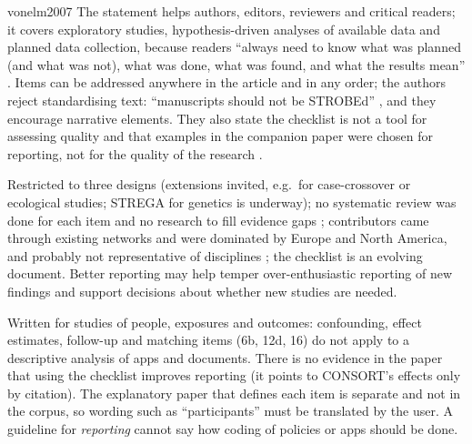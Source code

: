 \begin{papercard}{vonelm2007}
 The statement helps authors, editors, reviewers and critical readers; it covers exploratory studies, hypothesis-driven analyses of available data and planned data collection, because readers ``always need to know what was planned (and what was not), what was done, what was found, and what the results mean'' . Items can be addressed anywhere in the article and in any order; the authors reject standardising text: ``manuscripts should not be STROBEd'' , and they encourage narrative elements. They also state the checklist is not a tool for assessing quality and that examples in the companion paper were chosen for reporting, not for the quality of the research .

 Restricted to three designs (extensions invited, e.g.\ for case-crossover or ecological studies; STREGA for genetics is underway); no systematic review was done for each item and no research to fill evidence gaps ; contributors came through existing networks and were dominated by Europe and North America, and probably not representative of disciplines ; the checklist is an evolving document. Better reporting may help temper over-enthusiastic reporting of new findings and support decisions about whether new studies are needed.

 Written for studies of people, exposures and outcomes: confounding, effect estimates, follow-up and matching items (6b, 12d, 16) do not apply to a descriptive analysis of apps and documents. There is no evidence in the paper that using the checklist improves reporting (it points to CONSORT's effects only by citation). The explanatory paper that defines each item is separate and not in the corpus, so wording such as ``participants'' must be translated by the user. A guideline for \emph{reporting} cannot say how coding of policies or apps should be done.


\end{papercard}
